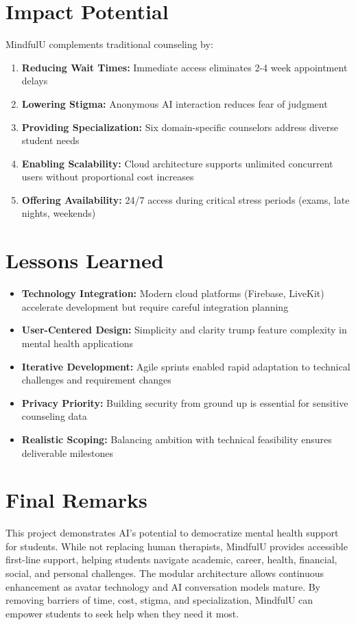 \documentclass[11pt,a4paper]{report}
\begin{document}
\section{Impact Potential}
MindfulU complements traditional counseling by:
\begin{enumerate}
    \item \textbf{Reducing Wait Times:} Immediate access eliminates 2-4 week appointment delays
    \item \textbf{Lowering Stigma:} Anonymous AI interaction reduces fear of judgment
    \item \textbf{Providing Specialization:} Six domain-specific counselors address diverse student needs
    \item \textbf{Enabling Scalability:} Cloud architecture supports unlimited concurrent users without proportional cost increases
    \item \textbf{Offering Availability:} 24/7 access during critical stress periods (exams, late nights, weekends)
\end{enumerate}

\section{Lessons Learned}
\begin{itemize}
    \item \textbf{Technology Integration:} Modern cloud platforms (Firebase, LiveKit) accelerate development but require careful integration planning
    \item \textbf{User-Centered Design:} Simplicity and clarity trump feature complexity in mental health applications
    \item \textbf{Iterative Development:} Agile sprints enabled rapid adaptation to technical challenges and requirement changes
    \item \textbf{Privacy Priority:} Building security from ground up is essential for sensitive counseling data
    \item \textbf{Realistic Scoping:} Balancing ambition with technical feasibility ensures deliverable milestones
\end{itemize}

\section{Final Remarks}
This project demonstrates AI's potential to democratize mental health support for students. While not replacing human therapists, MindfulU provides accessible first-line support, helping students navigate academic, career, health, financial, social, and personal challenges. The modular architecture allows continuous enhancement as avatar technology and AI conversation models mature. By removing barriers of time, cost, stigma, and specialization, MindfulU can empower students to seek help when they need it most.
\end{document}
